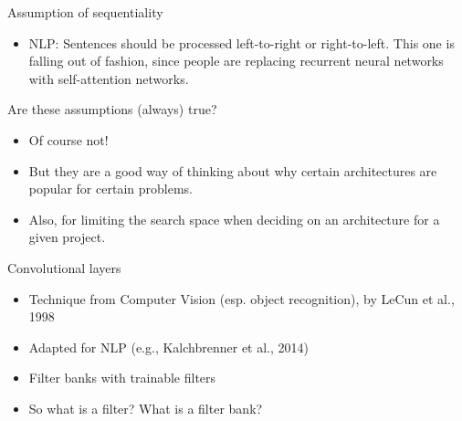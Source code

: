 
\begin{vbframe}{Assumption of sequentiality}

\vfill

\begin{itemize}
	\item NLP: Sentences should be processed left-to-right or right-to-left. This one is falling out of fashion, since people are replacing recurrent neural networks with self-attention networks.
\end{itemize}

\vfill

\end{vbframe}


\begin{vbframe}{Are these assumptions (always) true?}

\vfill

\begin{itemize}
\item Of course not!
\item But they are a good way of thinking about why certain architectures are popular for certain problems.
\item Also, for limiting the search space when deciding on an architecture for a given project.
\end{itemize}

\vfill

\end{vbframe}


\begin{vbframe}{Convolutional layers}

\vfill

\begin{itemize}
	\item Technique from Computer Vision (esp. object recognition), by LeCun et al., 1998
	\item Adapted for NLP (e.g., Kalchbrenner et al., 2014)
	\item Filter banks with trainable filters
	\item So what is a filter? What is a filter bank?
\end{itemize}

\vfill

\end{vbframe}

